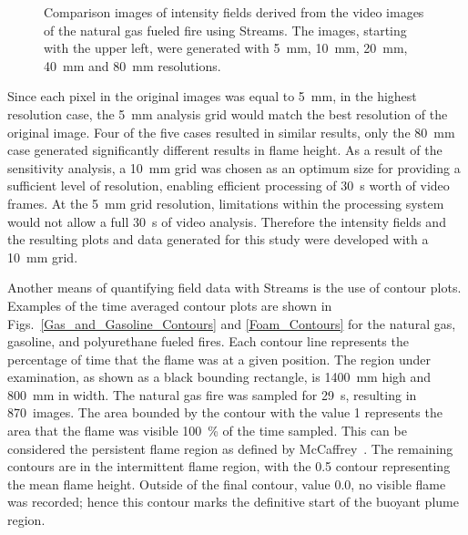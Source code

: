 \documentclass[twoside]{uocthesis}
\begin{document}
{\begin{figure}[p]
	 \caption[Comparison images of intensity fields derived from the video images of the natural gas fueled fire]{Comparison images of intensity fields derived from the video images of the natural gas fueled fire using Streams. The images, starting with the upper left, were generated with 5~mm, 10~mm, 20~mm, 40~mm and 80~mm resolutions.}
	 \label{Intensity}
\end{figure}


Since each pixel in the original images was equal to 5~mm, in the highest resolution case, the 5~mm analysis grid would match the best resolution of the original image.  Four of the five cases resulted in similar results, only the 80~mm case generated significantly different results in flame height.  As a result of the sensitivity analysis, a 10~mm grid was chosen as an optimum size for providing a sufficient level of resolution, enabling efficient processing of 30~s worth of video frames.  At the 5~mm grid resolution, limitations within the processing system would not allow a full 30~s of video analysis.  Therefore the intensity fields and the resulting plots and data generated for this study were developed with a 10~mm grid.

Another means of quantifying field data with Streams is the use of contour plots.  Examples of the time averaged contour plots are shown in Figs.~\ref{Gas_and_Gasoline_Contours} and \ref{Foam_Contours} for the natural gas, gasoline, and polyurethane fueled fires.  Each contour line represents the percentage of time that the flame was at a given position. The region under examination, as shown as a black bounding rectangle, is 1400~mm high and 800~mm in width.  The natural gas fire was sampled for 29~s, resulting in 870~images. The area bounded by the contour with the value 1 represents the area that the flame was visible 100~\% of the time sampled. This can be considered the persistent flame region as defined by McCaffrey~\cite{McCaffrey:1979}. The remaining contours are in the intermittent flame region, with the 0.5 contour representing the mean flame height. Outside of the final contour, value 0.0, no visible flame was recorded; hence this contour marks the definitive start of the buoyant plume region.

}
\end{document}
